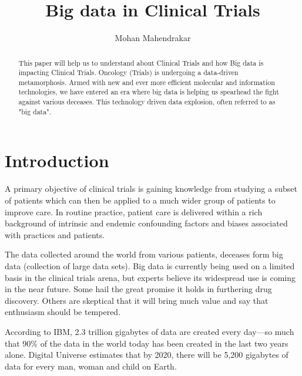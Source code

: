 \documentclass[sigconf]{acmart}
\begin{document}
\title{Big data in Clinical Trials}
\author{Mohan Mahendrakar}

\renewcommand{\shortauthors}{B. Trovato et al.}


\begin{abstract}
This paper will help us to understand about Clinical Trials and how Big
data is impacting Clinical Trials. Oncology (Trials) is undergoing a
data-driven metamorphosis. Armed with new and ever more efficient
molecular and information technologies, we have entered an era where big
data is helping us spearhead the fight against various deceases. This
technology driven data explosion, often referred to as "big data".
\cite{TR01}
\end{abstract}


\maketitle

\section{Introduction}
A primary objective of clinical trials is gaining knowledge from studying
a subset of patients which can then be applied to a much wider group of
patients to improve care. In routine practice, patient care is delivered
within a rich background of intrinsic and endemic confounding factors and
biases associated with practices and patients.  \cite{TR02}

The data collected around the world from various patients, deceases form
big data (collection of large data sets). Big data is currently being
used on a limited basis in the clinical trials arena, but experts believe
its widespread use is coming in the near future. Some hail the great
promise it holds in furthering drug discovery. Others are skeptical that
it will bring much value and say that enthusiasm should be tempered. \cite{TR05} 

According to IBM, 2.3 trillion gigabytes of data are created every 
day—so much that 90\% of the data in the world today has been created
in the last two years alone. Digital Universe estimates that by 2020,
there will be 5,200 gigabytes of data for every man, woman and child 
on Earth.
\end{document}

